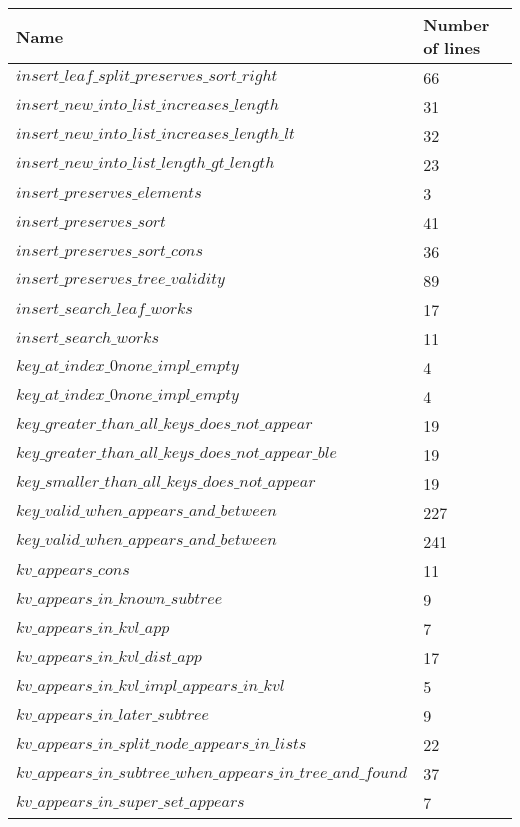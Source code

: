 \begin{tabular}{| l | l |}
\hline
Name & Number of lines \\ \hline
$insert\_leaf\_split\_preserves\_sort\_right$ & 66 \\ \hline
$insert\_new\_into\_list\_increases\_length$ & 31 \\ \hline
$insert\_new\_into\_list\_increases\_length\_lt$ & 32 \\ \hline
$insert\_new\_into\_list\_length\_gt\_length$ & 23 \\ \hline
$insert\_preserves\_elements$ & 3 \\ \hline
$insert\_preserves\_sort$ & 41 \\ \hline
$insert\_preserves\_sort\_cons$ & 36 \\ \hline
$insert\_preserves\_tree\_validity$ & 89 \\ \hline
$insert\_search\_leaf\_works$ & 17 \\ \hline
$insert\_search\_works$ & 11 \\ \hline
$key\_at\_index\_0none\_impl\_empty$ & 4 \\ \hline
$key\_at\_index\_0none\_impl\_empty$ & 4 \\ \hline
$key\_greater\_than\_all\_keys\_does\_not\_appear$ & 19 \\ \hline
$key\_greater\_than\_all\_keys\_does\_not\_appear\_ble$ & 19 \\ \hline
$key\_smaller\_than\_all\_keys\_does\_not\_appear$ & 19 \\ \hline
$key\_valid\_when\_appears\_and\_between$ & 227 \\ \hline
$key\_valid\_when\_appears\_and\_between$ & 241 \\ \hline
$kv\_appears\_cons$ & 11 \\ \hline
$kv\_appears\_in\_known\_subtree$ & 9 \\ \hline
$kv\_appears\_in\_kvl\_app$ & 7 \\ \hline
$kv\_appears\_in\_kvl\_dist\_app$ & 17 \\ \hline
$kv\_appears\_in\_kvl\_impl\_appears\_in\_kvl$ & 5 \\ \hline
$kv\_appears\_in\_later\_subtree$ & 9 \\ \hline
$kv\_appears\_in\_split\_node\_appears\_in\_lists$ & 22 \\ \hline
$kv\_appears\_in\_subtree\_when\_appears\_in\_tree\_and\_found$ & 37 \\ \hline
$kv\_appears\_in\_super\_set\_appears$ & 7 \\ \hline

\end{tabular}
